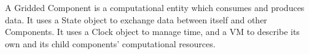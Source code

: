 %


A Gridded Component is a computational entity which consumes 
and produces data.  It uses a State object to exchange data 
between itself and other Components.  It uses a Clock object 
to manage time, and a VM to describe its own and its child
components' computational resources.



